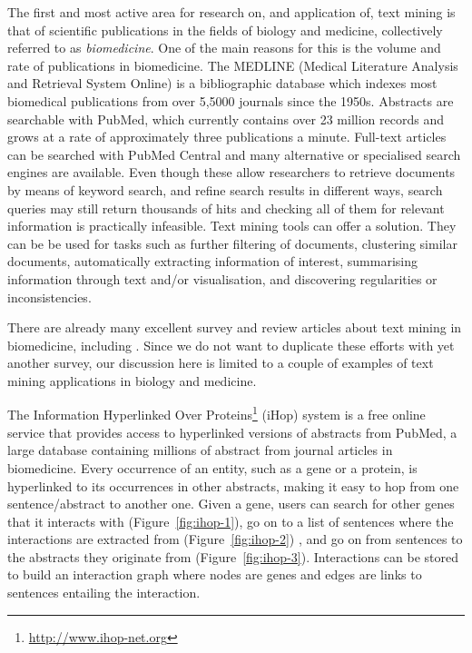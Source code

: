 The first and most active area for research on, and application of, text mining is that of scientific publications in the fields of biology and medicine, collectively referred to as \emph{biomedicine}.
One of the main reasons for this is the volume and rate of publications in biomedicine.
The MEDLINE (Medical Literature Analysis and Retrieval System Online) is a bibliographic database which indexes most biomedical publications from over 5,5000 journals since the 1950s.
Abstracts are searchable with PubMed, which currently contains over 23 million records and grows at a rate of approximately three publications a minute.
Full-text articles can be searched with PubMed Central and many alternative or specialised search engines are available. 
Even though these allow researchers to retrieve documents by means of keyword search, and refine search results in different ways, search queries may still return thousands of hits and checking all of them for relevant information is practically infeasible.
Text mining tools can offer a solution.
They can be be used for tasks such as further filtering of documents, clustering similar documents, automatically extracting information of interest, summarising information through text and/or visualisation, and discovering regularities or inconsistencies.

There are already many excellent survey and review articles about text mining in biomedicine, including
\citep{Neves2012Survey,Simpson2012Biomedical,Andronis2011Literature,Ananiadou2010Event,RodriguezEsteban2009Biomedical,Zweigenbaum2009Advanced,Cohen2008Getting,Zweigenbaum2007Frontiers,Ananiadou2006,Erhardt2006Status,JenEA06,Spasic2005Text,Cohen2005Survey,Krauthammer2004Term,Blake2011Text,Krallinger2010Analysis}.
Since we do not want to duplicate these efforts with yet another survey, our discussion here is limited to a couple of examples of text mining applications in biology and medicine.

The Information Hyperlinked Over Proteins\footnote{\url{http://www.ihop-net.org}} (iHop) system \citep{hoffmann2004gene} is a free online service that provides access to hyperlinked versions of abstracts from PubMed, a large database containing millions of abstract from journal articles in biomedicine.
Every occurrence of an entity, such as a gene or a protein, is hyperlinked to its occurrences in other abstracts, making it easy to hop from one sentence/abstract to another one.
Given a gene, users can search for other genes that it interacts with (Figure~\ref{fig:ihop-1}), go on to a list of sentences where the interactions are extracted from (Figure~\ref{fig:ihop-2}) , and go on from sentences to the abstracts they originate from  (Figure~\ref{fig:ihop-3}).   
Interactions can be stored to build an interaction graph where nodes are genes and edges are links to sentences entailing the interaction. 

